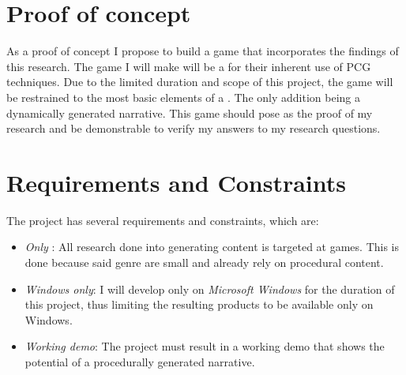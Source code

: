 \section{Proof of concept}
As a proof of concept I propose to build a game that incorporates the findings of this research. The game I will make will be a \rogue for their inherent use of PCG techniques. Due to the limited duration and scope of this project, the game will be restrained to the most basic elements of a \rogue. The only addition being a dynamically generated narrative. This game should pose as the proof of my research and be demonstrable to verify my answers to my research questions.

\section{Requirements and Constraints}
The project has several requirements and constraints, which are:
\begin{itemize}
\item \textit{Only} \rogue:		All research done into generating content is targeted at \rogue games. This is done because said genre are small and already rely on procedural content.
\item \textit{Windows only}: 	I will develop only on \textit{Microsoft Windows} for the duration of this project, thus limiting the resulting products to be available only on Windows.
\item \textit{Working demo}: 	The project must result in a working demo that shows the potential of a procedurally generated narrative.
\end{itemize}
